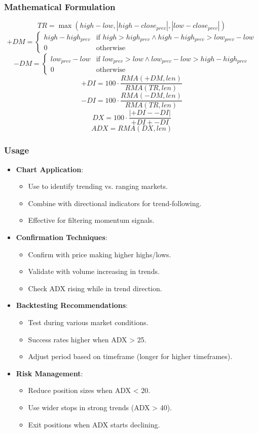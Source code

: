 \documentclass[12pt]{article}
\begin{document}
\subsubsection{Mathematical Formulation}
\[
TR = \max(high - low, |high - close_{prev}|, |low - close_{prev}|)
\]
\[
+DM = \begin{cases} 
high - high_{prev} & \text{if } high > high_{prev} \land high - high_{prev} > low_{prev} - low \\
0 & \text{otherwise}
\end{cases}
\]
\[
-DM = \begin{cases} 
low_{prev} - low & \text{if } low_{prev} > low \land low_{prev} - low > high - high_{prev} \\
0 & \text{otherwise}
\end{cases}
\]
\[
+DI = 100 \cdot \frac{RMA(+DM, len)}{RMA(TR, len)}
\]
\[
-DI = 100 \cdot \frac{RMA(-DM, len)}{RMA(TR, len)}
\]
\[
DX = 100 \cdot \frac{|+DI - -DI|}{+DI + -DI}
\]
\[
ADX = RMA(DX, len)
\]

\subsubsection{Usage}
\begin{itemize}
\item \textbf{Chart Application}:
  \begin{itemize}
  \item Use to identify trending vs. ranging markets.
  \item Combine with directional indicators for trend-following.
  \item Effective for filtering momentum signals.
  \end{itemize}
\item \textbf{Confirmation Techniques}:
  \begin{itemize}
  \item Confirm with price making higher highs/lows.
  \item Validate with volume increasing in trends.
  \item Check ADX rising while in trend direction.
  \end{itemize}
\item \textbf{Backtesting Recommendations}:
  \begin{itemize}
  \item Test during various market conditions.
  \item Success rates higher when ADX > 25.
  \item Adjust period based on timeframe (longer for higher timeframes).
  \end{itemize}
\item \textbf{Risk Management}:
  \begin{itemize}
  \item Reduce position sizes when ADX < 20.
  \item Use wider stops in strong trends (ADX > 40).
  \item Exit positions when ADX starts declining.
  \end{itemize}
\end{itemize}
\end{document}
